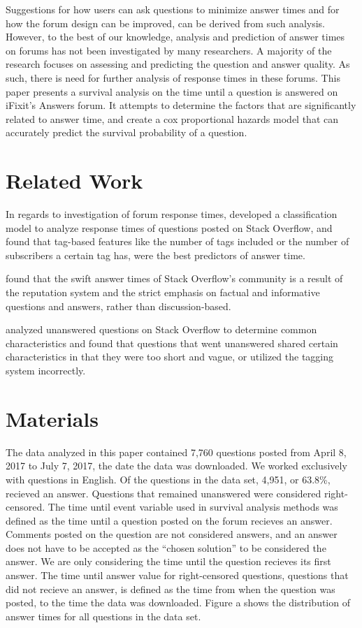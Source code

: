 \documentclass[12pt]{article}
\begin{document}
    Suggestions for how users can ask questions to minimize answer times and for how the forum design can be improved, can be derived from such analysis. However, to the best of our knowledge, analysis and prediction of answer times on forums has not been investigated by many researchers. A majority of the research focuses on assessing and predicting the question and answer quality. As such, there is need for further analysis of response times in these forums. This paper presents a survival analysis on the time until a question is answered on iFixit's Answers forum. It attempts to determine the factors that are significantly related to answer time, and create a cox proportional hazards model that can accurately predict the survival probability of a question.

\section{Related Work}

    In regards to investigation of forum response times, \citep{Bhat2014} developed a classification model to analyze response times of questions posted on Stack Overflow, and found that tag-based features like the number of tags included or the number of subscribers a certain tag has, were the best predictors of answer time. 

    \citep{Mamykina2011} found that the swift answer times of Stack Overflow's community is a result of the reputation system and the strict emphasis on factual and informative questions and answers, rather than discussion-based. 

    \citep{Asaduzzaman2013} analyzed unanswered questions on Stack Overflow to determine common characteristics and found that questions that went unanswered shared certain characteristics in that they were too short and vague, or utilized the tagging system incorrectly. 

\section{Materials}

    The data analyzed in this paper contained 7,760 questions posted from April 8, 2017 to July 7, 2017, the date the data was downloaded. We worked exclusively with questions in English. Of the questions in the data set, 4,951, or 63.8\%, recieved an answer. Questions that remained unanswered were considered right-censored. The time until event variable used in survival analysis methods was defined as the time until a question posted on the forum recieves an answer. Comments posted on the question are not considered answers, and an answer does not have to be accepted as the ``chosen solution'' to be considered the answer. We are only considering the time until the question recieves its first answer. The time until answer value for right-censored questions, questions that did not recieve an answer, is defined as the time from when the question was posted, to the time the data was downloaded. Figure a shows the distribution of answer times for all questions in the data set. 
    
\end{document}
